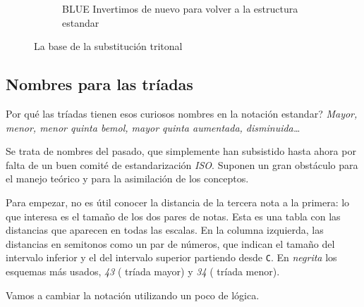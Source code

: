 \documentclass[]{article}
\begin{document}
\begin{figure}[H]
\begin{subfigure}{0.30\textwidth}
	  \end{subfigure}
	  \hfill	
	  \begin{subfigure}{0.30\textwidth}
		\centering
		\caption{\textsf{BLUE} Invertimos de nuevo para volver a la estructura estandar}
		
	  \end{subfigure}
	  \hfill	
    \caption{La base de la substitución tritonal}\label{fig:tritonal-substitution}
	\end{figure}

  
\subsection{Nombres para las tríadas}

Por qué las tríadas tienen esos curiosos nombres en la notación estandar? \emph{Mayor, menor, menor quinta bemol, mayor quinta   aumentada, disminuida\ldots{}}

Se trata de nombres del pasado, que simplemente han subsistido hasta ahora por falta de un buen comité de estandarización \emph{ISO}. Suponen un gran obstáculo para el manejo teórico y para la asimilación de los conceptos.

Para empezar, no es útil conocer la distancia de la tercera nota a la primera: lo que interesa es el tamaño de los dos pares de notas. Esta es una tabla con las distancias que aparecen en todas las escalas. En la columna izquierda, las distancias en semitonos como un par de números, que indican el tamaño del intervalo inferior y el del intervalo superior partiendo desde \texttt{C}. En \emph{negrita} los esquemas más usados, \emph{43} ( tríada mayor) y \emph{34} ( tríada menor).

Vamos a cambiar la notación utilizando un poco de lógica.
\end{document}
